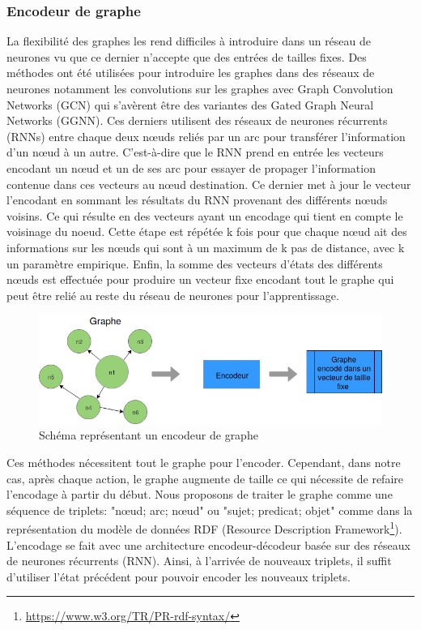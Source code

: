 \subsubsection*{Encodeur de graphe}
La flexibilité des graphes les rend difficiles à introduire dans un réseau de neurones vu que ce dernier n'accepte que des entrées de tailles fixes. Des méthodes ont été utilisées pour introduire les graphes dans des réseaux de neurones notamment les convolutions sur les graphes avec Graph Convolution Networks (GCN)\citep{KipfW17} qui s'avèrent être des variantes des Gated Graph Neural Networks (GGNN)\citep{Li2016GatedGS}. Ces derniers utilisent des réseaux de neurones récurrents (RNNs) entre chaque deux n\oe{}uds reliés par un arc pour transférer l'information d'un n\oe{}ud à un autre. C'est-à-dire que le RNN prend en entrée les vecteurs encodant un n\oe{}ud et un de ses arc pour essayer de propager l'information contenue dans ces vecteurs au n\oe{}ud destination. Ce dernier met à jour le vecteur l'encodant en sommant les résultats du RNN provenant des différents n\oe{}uds voisins. Ce qui résulte en des vecteurs ayant un encodage qui tient en compte le voisinage du noeud. Cette étape est répétée k fois pour que chaque n\oe{}ud ait des informations sur les n\oe{}uds qui sont à un maximum de k pas de distance, avec k un paramètre empirique. Enfin, la somme des vecteurs d'états des différents n\oe{}uds est effectuée pour produire un vecteur fixe encodant tout le graphe qui peut être relié au reste du réseau de neurones pour l'apprentissage.
\begin{figure}[H] 
	\centering
	\includegraphics[width=0.9\linewidth]{images/Conception/DM/encoder.png}
	\caption{Schéma représentant un encodeur de graphe}
	
\end{figure}\label{encoder}
Ces méthodes nécessitent tout le graphe pour l'encoder. Cependant, dans notre cas, après chaque action, le graphe augmente de taille ce qui nécessite de refaire l'encodage à partir du début. Nous proposons de traiter le graphe comme une séquence de triplets: "n\oe{}ud; arc; n\oe{}ud" ou "sujet; predicat; objet" comme dans la représentation du modèle de données RDF (Resource Description Framework\footnote{\hyperlink{https://www.w3.org/TR/PR-rdf-syntax/}{https://www.w3.org/TR/PR-rdf-syntax/}}). L'encodage se fait avec une architecture encodeur-décodeur basée sur des réseaux de neurones récurrents (RNN). Ainsi, à l'arrivée de nouveaux triplets, il suffit d'utiliser l'état précédent pour pouvoir encoder les nouveaux triplets.
